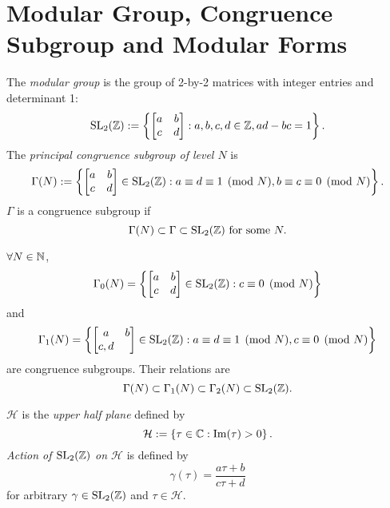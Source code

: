 \section{Modular Group, Congruence Subgroup and Modular Forms}
\begin{definition}
  The \textit{modular group} is the group of 2-by-2 matrices with integer entries and determinant 1:
  \begin{equation*}
    \operatorname{SL}_2(\mathbb{Z}):=\left\{ \begin{bmatrix} a & b\\
    c & d\end{bmatrix}:a,b,c,d\in \mathbb{Z},ad-bc=1  \right\} .
  \end{equation*}
  The \textit{principal congruence subgroup of level $N$} is 
  \begin{equation*}
    \Gamma(N):=\left\{ \begin{bmatrix} a&b\\
    c&d\end{bmatrix} \in \operatorname{SL}_2(\mathbb{Z}):a\equiv d\equiv 1\pmod{N},  b\equiv c\equiv 0 \pmod{N}\right\} 
 . \end{equation*}
 $\Gamma$ is a congruence subgroup if 
 \[
   \Gamma(N)\subset \Gamma\subset \operatorname{SL}_2(\mathbb{Z}) \text{ for some }N.
 \] 
\end{definition}
\begin{example}
  $\forall N\in \mathbb{N}$, 
  \[
    \Gamma_0(N)=\left\{ \begin{bmatrix} a&b\\c&d \end{bmatrix} \in \operatorname{SL}_2(\mathbb{Z}):c\equiv 0 \pmod{N} \right\} 
  \]
  and 
  \[
    \Gamma_1(N)=\left\{ \begin{bmatrix} a&b\\c,d \end{bmatrix} \in \operatorname{SL}_2(\mathbb{Z}):a\equiv d\equiv 1\pmod{N}, c\equiv 0\pmod{N} \right\} 
  \] 
  are congruence subgroups. Their relations are
  \[
    \Gamma(N)\subset \Gamma_1(N)\subset \Gamma_2(N)\subset \operatorname{SL}_2(\mathbb{Z}).
  \] 		

\end{example}
\begin{definition}
   $\mathcal{H}$ is the \textit{upper half plane} defined by 
   \[
     \mathcal{H}:=\left\{ \tau \in \mathbb{C}:\operatorname{Im}(\tau)>0 \right\} 
   .\]
   \textit{Action of $\operatorname{SL}_2(\mathbb{Z})$ on $\mathcal{H}$} is defined by
   \[
     \gamma(\tau)= \frac{a\tau+b}{c\tau+d}
   \] 
  for arbitrary $\gamma \in \operatorname{SL}_2(\mathbb{Z})$ and $\tau \in \mathcal{H}$.
   
\end{definition}

